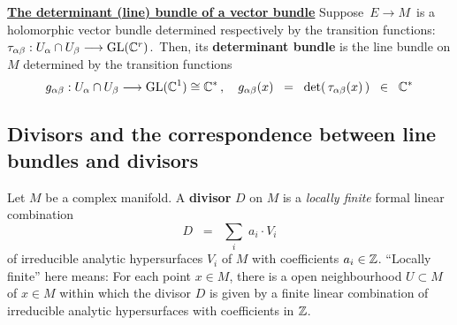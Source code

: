 \vskip 0.5cm
\noindent
\underline{\textbf{The determinant (line) bundle of a vector bundle}}
\vskip 0.1cm
\noindent
Suppose
\,$E \longrightarrow M$\,
is a holomorphic vector bundle
determined respectively by the transition functions:
\,$\tau_{\alpha\beta} : U_{\alpha} \cap U_{\beta} \longrightarrow \textnormal{GL}(\mathbb{C}^{r})$.\,
Then, its \textbf{determinant bundle} is the line bundle on $M$
determined by the transition functions
\begin{equation*}
g_{\alpha\beta} : U_{\alpha} \cap U_{\beta} \longrightarrow \textnormal{GL}(\mathbb{C}^{1}) \cong \mathbb{C}^{*}\,,
\quad
g_{\alpha\beta}(x)
\;\; = \;\;
	\det\!\left(\,\tau_{\alpha\beta}(x)\,\right)
\;\; \in \;\;
	\mathbb{C}^{*}
\end{equation*}


\subsection{Divisors and the correspondence between line bundles and divisors}

Let $M$ be a complex manifold.
A \textbf{divisor} $D$ on $M$ is a \textit{locally finite} formal linear combination
\begin{equation*}
D
\;\; = \;\;
	\underset{i}{\sum}\;a_{i} \cdot V_{i}
\end{equation*}
of irreducible analytic hypersurfaces $V_{i}$ of $M$ with coefficients $a_{i} \in \mathbb{Z}$.
``Locally finite'' here means:
For each point $x \in M$, there is a open neighbourhood $U \subset M$ of $x \in M$ within which
the divisor $D$ is given by a finite linear combination of irreducible analytic hypersurfaces with coefficients in $\mathbb{Z}$.

